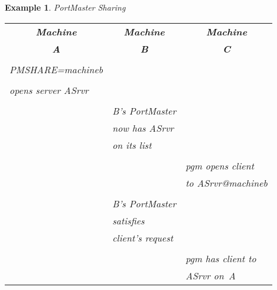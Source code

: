 \documentclass[12pt]{article}
\newtheorem{example}{Example}[section]
\begin{document}
\begin{example} PortMaster Sharing \rm     \\ \label{pmsharing}
  \begin{tabular}{|l|l|l|} \hline
  \multicolumn{1}{|c|}{\bf Machine} & \multicolumn{1}{c|}{\bf Machine} & \multicolumn{1}{c|}{\bf Machine} \\
  \multicolumn{1}{|c|}{\bf A}       & \multicolumn{1}{c|}{\bf B}       & \multicolumn{1}{c|}{\bf C}       \\
  \hline
                                    &                                  &                                  \\
  PMSHARE=machineb                  &                                  &                                  \\
                                    &                                  &                                  \\
  opens server {\em ASrvr}          &                                  &                                  \\
                                    &                                  &                                  \\
                                    & B's PortMaster                   &                                  \\
                                    & now has {\em ASrvr}              &                                  \\
                                    & on its list                      &                                  \\
                                    &                                  &                                  \\
                                    &                                  & pgm opens client                 \\
                                    &                                  & to ASrvr@machineb                \\
                                    &                                  &                                  \\
                                    & B's PortMaster                   &                                  \\
                                    & satisfies                        &                                  \\
                                    & client's request                 &                                  \\
                                    &                                  &                                  \\
                                    &                                  & pgm has client to                \\
                                    &                                  & {\em ASrvr} on~A~                \\
\hline
  \end{tabular}
\end{example}
\end{document}
